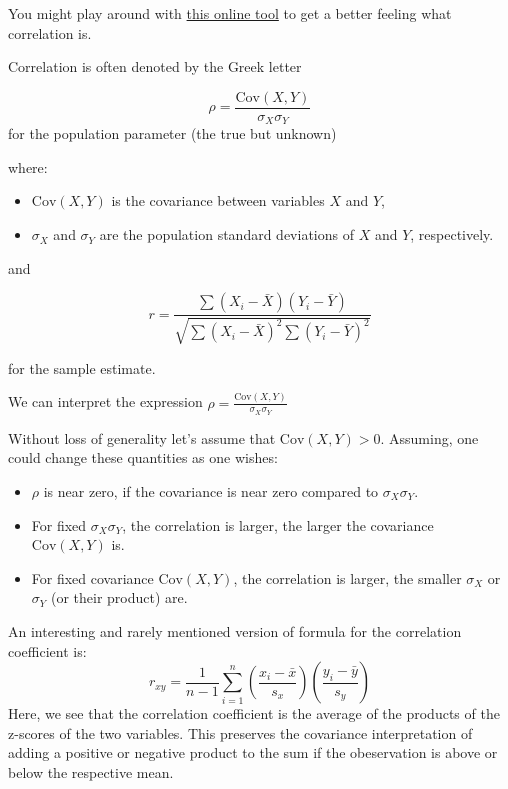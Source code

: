 \documentclass[
]{book}
\begin{document}
You might play around with \href{https://rpsychologist.com/correlation/}{this online tool}
to get a better feeling what correlation is.

Correlation is often denoted by the Greek letter

\[\rho = \frac{\text{Cov}(X, Y)}{\sigma_X \sigma_Y}\]
for the population parameter (the true but unknown)

where:

\begin{itemize}
\item
  \(\text{Cov}(X, Y)\) is the covariance between variables \(X\) and \(Y\),
\item
  \(\sigma_X\) and \(\sigma_Y\) are the population standard deviations of \(X\) and \(Y\), respectively.
\end{itemize}

and

\[r = \frac{\sum (X_i - \bar{X})(Y_i - \bar{Y})}{\sqrt{\sum (X_i - \bar{X})^2 \sum (Y_i - \bar{Y})^2}}\]

for the sample estimate.

We can interpret the expression \(\rho = \frac{\text{Cov}(X, Y)}{\sigma_X \sigma_Y}\)

Without loss of generality let's assume that \(\text{Cov}(X, Y) > 0\). Assuming, one could change these quantities as one wishes:

\begin{itemize}
\item
  \(\rho\) is near zero, if the covariance is near zero compared to \(\sigma_X \sigma_Y\).
\item
  For fixed \(\sigma_X \sigma_Y\), the correlation is larger, the larger the covariance \(\text{Cov}(X, Y)\) is.
\item
  For fixed covariance \(\text{Cov}(X, Y)\), the correlation is larger, the smaller \(\sigma_X\) or \(\sigma_Y\) (or their product) are.
\end{itemize}

An interesting and rarely mentioned version of formula for the correlation coefficient is:
\[ r_{xy} = \frac{1}{n-1} \sum_{i=1}^{n} \left( \frac{x_i - \bar{x}}{s_x} \right) \left( \frac{y_i - \bar{y}}{s_y} \right) \]
Here, we see that the correlation coefficient is the average of the products of the z-scores of the two variables.
This preserves the covariance interpretation of adding a positive or negative product to the sum if the obeservation is above or below the respective mean.
\end{document}
